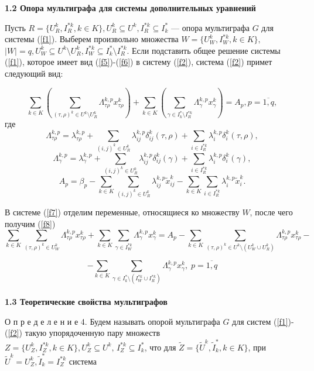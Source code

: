 \documentclass[14pt]{extarticle}%
\begin{document}
 \textbf{1.2 Опора мультиграфа для системы дополнительных уравнений}

Пусть $R=\{U^k_R, I^{*k}_R, k\in K\},U^k_R\subseteq U^k, I^{*k}_R\subseteq I^*_k$ --- опора мультиграфа $G$ для системы (\ref{f1}). Выберем произвольно множества $W=\{U^k_W, I^{*k}_W, k\in K\},$\\ $|W|=q, U^k_W\subseteq U^k\setminus U^k_R, I^{*k}_W\subseteq I^*_k\setminus I^{*k}_R$. Если подставить общее решение системы (\ref{f1}), которое имеет вид (\ref{f5})-(\ref{f6}) в систему (\ref{f2}), система (\ref{f2}) примет следующий вид:

\begin{equation}
     \sum_{k\in K}\left(\sum_{(\tau,\rho)^k\in U^k\setminus U^k_R}\Lambda^{k,p}_{\tau\rho}x^k_{\tau\rho}\right)+\sum_{k\in K}\left(\sum_{\gamma\in I^*_k\setminus I^{*k}_R}\Lambda^{k,p}_\gamma x^k_\gamma\right)=A_p, p=\overline{1,q}, \label{f7}
 \end{equation}
 где
 $$
 \Lambda^{k,p}_{\tau\rho}=\lambda^{k,p}_{\tau\rho}+\sum_{(i,j)^k\in U^k_R}\lambda^{k,p}_{ij}\delta^k_{ij}(\tau, \rho)+\sum_{i\in I^{*k}_R}\lambda^{k,p}_{i}\delta^k_{i}(\tau, \rho),
 $$
 $$
 \Lambda^{k,p}_{\gamma}=\lambda^{k,p}_{\gamma}+\sum_{(i,j)^k\in U^k_R}\lambda^{k,p}_{ij}\delta^k_{ij}(\gamma)+\sum_{i\in I^{*k}_R}\lambda^{k,p}_{i}\delta^k_{i}(\gamma),
 $$
 $$
 A_p=\beta_p-\sum_{k\in K}\sum_{(i,j)^k\in U^k_R}\lambda^{k,p}_{ij}\widetilde x^k_{ij}-\sum_{k\in K}\sum_{i\in I^{*k}_R}\lambda^{k,p}_{i}\widetilde x^k_{i}.
 $$
 
 В системе (\ref{f7}) отделим переменные, относящиеся ко множеству $W$, после чего получим (\ref{f8})
 \begin{equation}
     \sum_{k\in K}\sum_{(\tau,\rho)^k\in U^k_W}\Lambda^{k,p}_{\tau\rho}x^k_{\tau\rho}+\sum_{k\in K}\sum_{\gamma\in I^{*k}_W}\Lambda^{k,p}_\gamma x^k_\gamma=A_p- \sum_{k\in K}\sum_{(\tau,\rho)^k\in U^k\setminus(U^k_W\cup U^k_R)}\Lambda^{k,p}_{\tau\rho}x^k_{\tau\rho}-\label{f8}
 \end{equation}
 
 $$-\sum_{k\in K}\sum_{\gamma\in I^*_k\setminus(I^{*k}_W\cup I^{*k}_R)}\Lambda^{k,p}_\gamma x^k_\gamma,\; p=\overline{1,q}$$\\

\textbf{1.3 Теоретические свойства мультиграфов}


О п р е д е л е н и е 4.  Будем называть опорой мультиграфа $G$ для систем (\ref{f1})-(\ref{f2}) такую упорядоченную пару множеств \\$Z=\{U^k_Z, I^{*k}_Z, k\in K\}, U^k_Z\subseteq U^k,\, I^{*k}_Z\subseteq I^*_k$, что для $\widetilde Z= \{\widetilde U^k,\widetilde I^*_k, k\in K\}$, при $\widetilde U^k=U^k_Z, \widetilde I^*_k=I^{*k}_Z$ система
\end{document}

